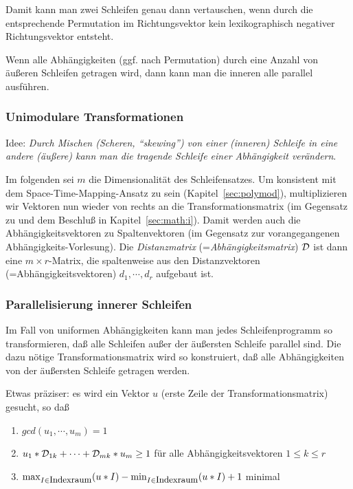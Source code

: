Damit kann man zwei Schleifen genau dann vertauschen, wenn durch die
entsprechende Permutation im Richtungsvektor kein lexikographisch
negativer Richtungsvektor entsteht.

Wenn alle Abhängigkeiten (ggf. nach Permutation) durch eine Anzahl von
äußeren Schleifen getragen wird, dann kann man die inneren alle parallel
ausführen.

\subsubsection{Unimodulare Transformationen}

Idee: \textit{Durch Mischen (Scheren, ``skewing'') von einer (inneren)
Schleife in
eine andere (äußere) kann man die tragende Schleife einer Abhängigkeit
verändern}.

Im folgenden sei $m$ die Dimensionalität des Schleifensatzes. Um
konsistent mit dem Space-Time-Mapping-Ansatz zu sein
(Kapitel~\ref{sec:polymod}), multiplizieren wir Vektoren nun wieder von
rechts an die Transformationsmatrix (im Gegensatz zu \cite{Ban93, Ban94}
und dem Beschluß in Kapitel~\ref{sec:math:i}). Damit werden auch die
Abhängigkeitsvektoren zu Spaltenvektoren (im Gegensatz zur
vorangegangenen Abhängigkeits-Vorlesung).  Die \emph{Distanzmatrix}
(=\emph{Abhängigkeitsmatrix}) $\cal D$ ist dann eine
$m\!\times\!r$-Matrix, die spaltenweise aus den Distanzvektoren
(=Abhängigkeitsvektoren) $d_1,\cdots,d_r$ aufgebaut ist.

\subsubsection{Parallelisierung innerer Schleifen}

Im Fall von uniformen Abhängigkeiten kann man jedes Schleifenprogramm so
transformieren, daß alle Schleifen außer der äußersten Schleife parallel
sind. Die dazu nötige Transformationsmatrix wird so konstruiert, daß
alle Abhängigkeiten von der äußersten Schleife getragen werden.

Etwas präziser: es wird ein Vektor $u$ (erste Zeile der
Transformationsmatrix) gesucht, so daß
\begin{enumerate}
\item $gcd(u_1,\cdots,u_m) = 1$\\[-7mm]
\item $u_1*{\cal D}_{1k} + \cdots + {\cal D}_{mk}*u_m \geq 1$ für alle
  Abhängigkeitsvektoren $1\!\leq\!k\!\leq\!r$\\[-7mm]
\item $\max_{I\in \textrm{\small Indexraum}}(u*I) - \min_{I\in
    \textrm{\small Indexraum}}(u*I) + 1$ minimal
\end{enumerate}

